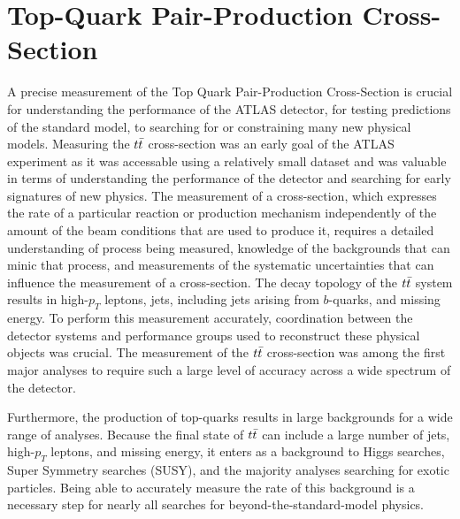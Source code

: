 %
%

\chapter{Top-Quark Pair-Production Cross-Section}

A precise measurement of the Top Quark Pair-Production Cross-Section is crucial for understanding the performance of the ATLAS detector, for testing predictions of the standard model, to searching for or constraining many new physical models.
Measuring the $t\bar{t}$ cross-section was an early goal of the ATLAS experiment as it was accessable using a relatively small dataset and was valuable in terms of understanding the performance of the detector and searching for early signatures of new physics.
The measurement of a cross-section, which expresses the rate of a particular reaction or production mechanism independently of the amount of the beam conditions that are used to produce it,
requires a detailed understanding of process being measured, knowledge of the backgrounds that can minic that process, and measurements of the systematic uncertainties that can influence the measurement of a cross-section.
The decay topology of the $t\bar{t}$ system results in high-$p_T$ leptons, jets, including jets arising from $b$-quarks, and missing energy.
To perform this measurement accurately, coordination between the detector systems and performance groups used to reconstruct these physical objects was crucial.
The measurement of the $t\bar{t}$ cross-section was among the first major analyses to require such a large level of accuracy across a wide spectrum of the detector. %

Furthermore, the production of top-quarks results in large backgrounds for a wide range of analyses.
Because the final state of $t\bar{t}$ can include a large number of jets, high-$p_T$ leptons, and missing energy, it enters as a background to Higgs searches, Super Symmetry searches (SUSY),
and the majority analyses searching for exotic particles.
Being able to accurately measure the rate of this background is a necessary step for nearly all searches for beyond-the-standard-model physics.

